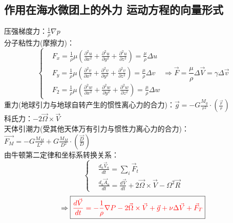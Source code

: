 \documentclass[a4paper,12pt]{article}
\begin{document}
    \subsection{作用在海水微团上的外力 运动方程的向量形式}
    压强梯度力：$\displaystyle\frac{1}{\rho}\nabla p$\\
    分子粘性力(摩擦力)：
    \[
        \left\{
        \begin{aligned}
            &F_{x}=\frac{1}{\rho} \mu\left(\frac{\partial^{2} u}{\partial x^{2}}+\frac{\partial^{2} u}{\partial y^{2}}+\frac{\partial^{2} u}{\partial z^{2}}\right)=\frac{\mu}{\rho} \Delta u\\
            &F_{y}=\frac{1}{\rho} \mu\left(\frac{\partial^{2} v}{\partial x^{2}}+\frac{\partial^{2} v}{\partial y^{2}}+\frac{\partial^{2} v}{\partial z^{2}}\right)=\frac{\mu}{\rho} \Delta v\\
            &F_{2}=\frac{1}{\rho} \mu\left(\frac{\partial^{2} w}{\partial x^{2}}+\frac{\partial^{2} w}{\partial y^{2}}+\frac{\partial^{2} w}{\partial z^{2}}\right)=\frac{\mu}{\rho} \Delta w
        \end{aligned}
        \right.
        \Rightarrow \vec{F}=\frac{\mu}{\rho}\Delta \vec{V}=\gamma\Delta\vec{v}
    \]
    重力(地球引力与地球自转产生的惯性离心力的合力)：$\displaystyle\vec{g}=-G\frac{M_g}{r^2}\cdot\left(\frac{\vec{r}}{r}\right)$\\
    科氏力：$\displaystyle -2\vec{\Omega}\times\vec{V}$\\
    天体引潮力(受其他天体万有引力与惯性力离心力的合力)：$\displaystyle\vec{F_M}=-G\frac{M_M}{L^2}+G\frac{M_M}{D^2}\cdot\left(\frac{\vec{D}}{D}\right)$\\
    由牛顿第二定律和坐标系转换关系：
    \[
        \left\{
        \begin{aligned}
            &\frac{d_{a} \vec{V}_{a}}{d t}=\sum_{i} \vec{F}_{t}\\
            &\frac{d_{a} \vec{A}_{a}}{d t}=\frac{d \vec{V}}{d t}+2 \vec{\Omega} \times \vec{V}-\Omega^{2} \vec{R}
        \end{aligned}
        \right.
    \]
    \[
        \Rightarrow\boxed{\color{red} \frac{d \vec{V}}{d t}=-\frac{1}{\rho} \nabla P-2 \vec{\Omega} \times \vec{V}+\vec{g} +\nu \Delta \vec{V}+\vec{F}_{T}}
    \]
\end{document}
